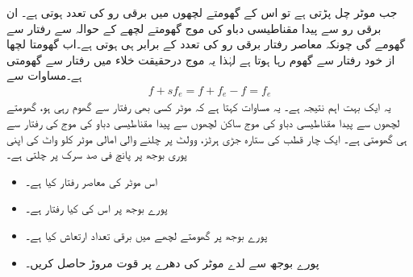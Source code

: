 جب موٹر چل پڑتی ہے تو اس کے گھومتے لچھوں میں برقی رو کی تعدد  ہوتی ہے۔ ان برقی رو سے پیدا مقناطیسی دباو کی موج گھومتے لچھے کے حوالہ سے  رفتار سے گھومے گی چونکہ معاصر رفتار برقی رو کی تعدد کے برابر ہی ہوتی ہے۔اب گھومتا لچھا از خود  رفتار سے گھوم رہا ہوتا ہے لہٰذا یہ موج درحقیقت خلاء میں  رفتار سے گھومتی ہے۔مساوات   سے
\begin{align}
f+s f_e=f +f_e-f=f_e
\end{align} 
یہ ایک بہت اہم نتیجہ ہے۔ یہ مساوات کہتا ہے کہ موٹر کسی بھی رفتار سے گھوم رہی ہو، گھومتے لچھوں سے پیدا مقناطیسی دباو کی موج ساکن لچھوں سے پیدا مقناطیسی دباو کی موج کی رفتار سے ہی گھومتی ہے۔
%
ایک چار قطب کی ستارہ جڑی  ہرٹز،  وولٹ  پر چلنے والی امالی موٹر  کلو واٹ کی اپنی پوری بوجھ پر پانچ فی صد سرک پر چلتی ہے۔
\begin{itemize}
\item
اس موٹر کی معاصر رفتار کیا ہے۔
\item
پورے بوجھ پر اس کی کیا رفتار ہے۔
\item
پورے بوجھ پر گھومتے لچھے میں برقی تعداد ارتعاش کیا ہے۔
\item
پورے بوجھ سے لدے موٹر کی دھرے پر قوت مروڑ حاصل کریں۔
\end{itemize}

